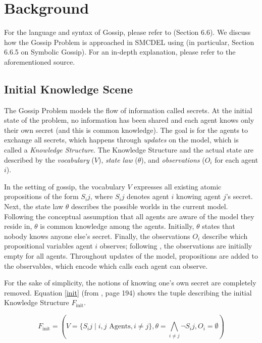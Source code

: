 \section{Background}\label{sec:Background}

For the language and syntax of Gossip, please refer to \cite{GattingerThesis2018} (Section 6.6).
We discuss how the Gossip Problem is approached in SMCDEL using \cite{GattingerThesis2018} (in particular, Section 6.6.5 on Symbolic Gossip).
For an in-depth explanation, please refer to the aforementioned source.

\subsection{Initial Knowledge Scene}
The Gossip Problem models the flow of information called secrets.
At the initial state of the problem, no information has been shared and each agent knows only their own secret (and this is common knowledge).
The goal is for the agents to exchange all secrets, which happens through \textit{updates} on the model, which is called a \textit{Knowledge Structure}.
The Knowledge Structure and the actual state are described by the \textit{vocabulary} ($V$),
\textit{state law} ($\theta$), and \textit{observations} ($O_i$ for each agent $i$).

In the setting of gossip, the vocabulary $V$ expresses all existing atomic propositions of
the form $S_ij$, where $S_ij$ denotes agent $i$ knowing agent $j$'s secret.
Next, the state law $\theta$ describes the possible worlds in the current model. Following the conceptual assumption that all agents
are aware of the model they reside in, $\theta$ is common knowledge among the agents. Initially, $\theta$ states that nobody knows
anyone else's secret. Finally, the observations $O_i$ describe which propositional
variables agent $i$ observes; following \cite{GattingerThesis2018}, the observations are initially empty for all agents.
Throughout updates of the model, propositions are added to the observables, which encode which calls each agent can observe.

For the sake of simplicity, the notions of knowing one's own secret are completely removed.
Equation \ref{init} (from \cite{GattingerThesis2018}, page 194)
shows the tuple describing the initial Knowledge Structure $F_\text{init}$.

\begin{equation}
\label{init}
    F_\text{init} = (V = \{S_ij \mid i, j \text{ Agents}, i \neq j\}, \theta =\bigwedge_{i\neq j} \lnot S_ij , O_i = \emptyset)
\end{equation}

